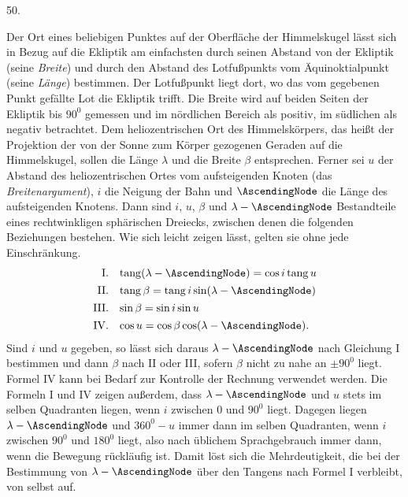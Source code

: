 \par{}
\begin{center}
\hypertarget{native-067-article050}{}50.
\end{center}
Der Ort eines beliebigen Punktes auf der Oberfläche der Himmelskugel lässt sich in Bezug auf die Ekliptik am einfachsten durch seinen Abstand von der Ekliptik (seine \emph{Breite}) und durch den Abstand des Lotfußpunkts vom Äquinoktialpunkt (seine \emph{Länge}) bestimmen. Der Lotfußpunkt liegt dort, wo das vom gegebenen Punkt gefällte Lot die Ekliptik trifft. Die Breite wird auf beiden Seiten der Ekliptik bis
$90^0$ gemessen und im nördlichen Bereich als positiv, im südlichen als negativ betrachtet. Dem heliozentrischen Ort des Himmelskörpers, das heißt der Projektion der von der Sonne zum Körper gezogenen Geraden auf die Himmelskugel, sollen die Länge $\lambda$ und die Breite $\beta$ entsprechen. Ferner sei $u$ der Abstand des heliozentrischen Ortes vom aufsteigenden Knoten (das \emph{Breitenargument}), $i$ die Neigung der Bahn und $\AscendingNode$ die Länge des aufsteigenden Knotens. Dann sind $i$, $u$, $\beta$ und $\lambda-\AscendingNode$ Bestandteile eines rechtwinkligen sphärischen Dreiecks, zwischen denen die folgenden Beziehungen bestehen. Wie sich leicht zeigen lässt, gelten sie ohne jede Einschränkung.
\[
\begin{array}{rl}
\mathrm{I.}&\operatorname{tang}(\lambda-\AscendingNode)=\cos i\operatorname{tang}u\\[4pt]
\mathrm{II.}&\operatorname{tang}\beta=\operatorname{tang}i\sin(\lambda-\AscendingNode)\\[4pt]
\mathrm{III.}&\sin\beta=\sin i\sin u\\[4pt]
\mathrm{IV.}&\cos u=\cos\beta\cos(\lambda-\AscendingNode).
\end{array}
\]
Sind $i$ und $u$ gegeben, so lässt sich daraus $\lambda-\AscendingNode$ nach Gleichung I bestimmen und dann $\beta$ nach II oder III, sofern $\beta$ nicht zu nahe an $\pm90^0$ liegt. Formel IV kann bei Bedarf zur Kontrolle der Rechnung verwendet werden. Die Formeln I und IV zeigen außerdem, dass $\lambda-\AscendingNode$ und $u$ stets im selben Quadranten liegen, wenn $i$ zwischen $0$ und $90^0$ liegt. Dagegen liegen $\lambda-\AscendingNode$ und $360^0-u$ immer dann im selben Quadranten, wenn $i$ zwischen $90^0$ und $180^0$ liegt, also nach üblichem Sprachgebrauch immer dann, wenn die Bewegung rückläufig ist. Damit löst sich die Mehrdeutigkeit, die bei der Bestimmung von $\lambda-\AscendingNode$ über den Tangens nach Formel I verbleibt, von selbst auf.

